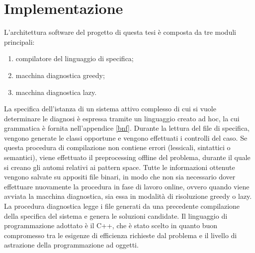 \chapter{Implementazione}
L'architettura software del progetto di questa tesi è composta da tre moduli principali:
\begin{enumerate}
\item compilatore del linguaggio di specifica;
\item macchina diagnostica greedy;
\item macchina diagnostica lazy.
\end{enumerate}
La specifica dell'istanza di un sistema attivo complesso di cui si vuole determinare le diagnosi è espressa tramite un linguaggio creato ad hoc, la cui grammatica è fornita nell'appendice \ref{bnf}.
Durante la lettura del file di specifica, vengono generate le classi opportune e vengono effettuati i controlli del caso. Se questa procedura di compilazione non contiene errori (lessicali, sintattici o semantici), viene effettuato il preprocessing offline del problema, durante il quale si creano gli automi relativi ai pattern space. Tutte le informazioni ottenute vengono salvate su appositi file binari, in modo che non sia necessario dover effettuare nuovamente la procedura in fase di lavoro online, ovvero quando viene avviata la macchina diagnostica, sia essa in modalità di risoluzione greedy o lazy. 
La procedura diagnostica legge i file generati da una precedente compilazione della specifica del sistema e genera le soluzioni candidate. 
Il linguaggio di programmazione adottato è il C++, che è stato scelto in quanto buon compromesso tra le esigenze di efficienza richieste dal problema e il livello di astrazione della programmazione ad oggetti.


